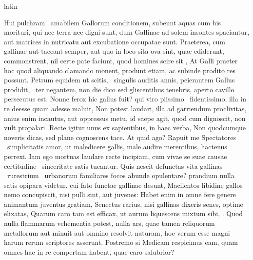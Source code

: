 \documentclass[12pt]{book}
\renewenvironment{latin}
    	{\begin{hyphenrules}{latin}}
    	{\end{hyphenrules}}
\begin{document}
\begin{pages}
\begin{latin}
\begin{Leftside}
                    Hui pulchram  \ampersand\ amabilem Gallorum conditionem, 
                    subeunt aquas cum his morituri, 
                    qui nec terra nec  digni sunt, 
                    dum Gallinae ad solem insontes spaciantur, aut matrices in nutricatu aut excubatione occupatae sunt. 
                    Praeterea, cum gallinae aut taceant semper, aut quo in loco sita ova sint, quae ediderunt, commonstrent, nil certe pate faciunt, quod homines scire sit , 
                    At Galli praeter hoc quod aliquando clamando monent, produnt etiam, ac subinde prodito res  possunt. 
                    Petrum equidem ut scitis,  \ampersand\ singulis auditis annis, peierantem Gallus prodidit,  \ampersand\ ter negantem, non die dico sed gliscentibus tenebris, aperto cavillo persecutus est. 
                    Nonne ferox hic gallus fuit? 
                    qui viro piissimo  \ampersand\ fidentissimo, illa in re deesse quam adesse maluit, 
                    Non potest laudari, illa ad garriendum proclivitas, anius enim incautus, aut oppressus metu, id saepe agit, quod cum dignoscit, non vult propalari. 
                    Recte igitur unus ex sapientibus, in haec verba, Non quodcumque noveris dicas, sed   plane cognoscens tace. 
                    At quid ago? Rapuit me Spectatores   \ampersand\ simplicitatis amor, 
                    ut maledicere gallis, male audire merentibus, hactenus perrexi. 
                    Iam ego mortuas laudare recte incipiam, cum vivae se suae causae certitudine  \ampersand\ sinceritate satis tueantur. 
                    Quis nescit defunctas vita gallinas  \ampersand\ rurestrium  \ampersand\ urbanorum familiares focos abunde opulentare? 
                    prandium nulla  satis opipara videtur, cui fato functae gallinae desunt, Macilentos libidine gallos nemo concupiscit, nisi pulli sint, aut juvenes: 
                    Habet enim in omne fere genere animantum juventus gratiam, Senectus rarius, nisi gallinas dixeris senes, optime elixatas, 
                    Quarum caro tam est efficax, ut aurum liquescens mixtum sibi, . 
                    Quod nulla flammarum vehementia potest, nulla ars, quae tamen reliquorum metallorum aut minuit aut omnino resolvit naturam, hoc verum esse magni harum rerum scriptores asserunt. 
                    Postremo si Medicam respicimus eam, quam omnes hac in re compertam habent, quae caro salubrior? 

\end{Leftside}
\end{latin}
\end{pages}
\end{document}
